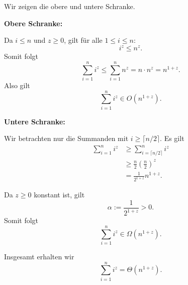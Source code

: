\documentclass{report}
\begin{document}
\begin{myproof}
  Wir zeigen die obere und untere Schranke.

  \textbf{Obere Schranke:}

  Da $i\le n$ und $z\ge 0$, gilt für alle
  $1\le i\le n$:
  \[
    i^z\le n^z.
  \]
  Somit folgt
  \[
    \sum_{i=1}^n i^z
    \le\sum_{i=1}^n n^z
    =n\cdot n^z
    =n^{1+z}.
  \]
  Also gilt
  \[
    \sum_{i=1}^n i^z\in O(n^{1+z}).
  \]

  \medskip
  \textbf{Untere Schranke:}

  Wir betrachten nur die Summanden mit
  $i\ge\lceil n/2\rceil$. Es gilt
  \begin{align*}
    \sum_{i=1}^n i^z
    &\ge\sum_{i=\lceil n/2\rceil}^n i^z\\
    &\ge\frac n2\left(\frac n2\right)^z\\
    &=\frac{1}{2^{1+z}}n^{1+z}.
  \end{align*}

  Da $z\ge 0$ konstant ist, gilt
  \[
    \alpha:=\frac{1}{2^{1+z}}>0.
  \]
  Somit folgt
  \[
    \sum_{i=1}^n i^z\in\Omega(n^{1+z}).
  \]

  Insgesamt erhalten wir
  \[
    \boxed{
      \sum_{i=1}^n i^z=\Theta(n^{1+z}).
    }
  \]
\end{myproof}


\end{document}
